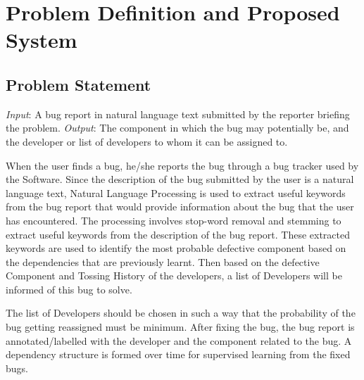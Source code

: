 
\chapter{Problem Definition and Proposed System} %


\section{Problem Statement}
\emph{Input}: A bug report in natural language text submitted by the reporter briefing the problem.\linebreak
\emph{Output}: The component in which the bug may potentially be, and the developer or list of developers to whom it can be assigned to.

When the user finds a bug, he/she reports the bug through a bug tracker used by the Software. Since the description of the bug submitted by the user is a natural language text, Natural Language Processing is used to extract useful keywords from the bug report that would provide information about the bug that the user has encountered. The processing involves stop-word removal and stemming to extract useful keywords from the description of the bug report. These extracted keywords are used to identify the most probable defective component based on the dependencies that are previously learnt. Then based on the defective Component and Tossing History of the developers, a list of Developers will be informed of this bug to solve.

The list of Developers should be chosen in such a way that the probability of the bug getting reassigned must be minimum. After fixing the bug, the bug report is annotated/labelled with the developer and the component related to the bug. A dependency structure is formed over time for supervised learning from the fixed bugs.

